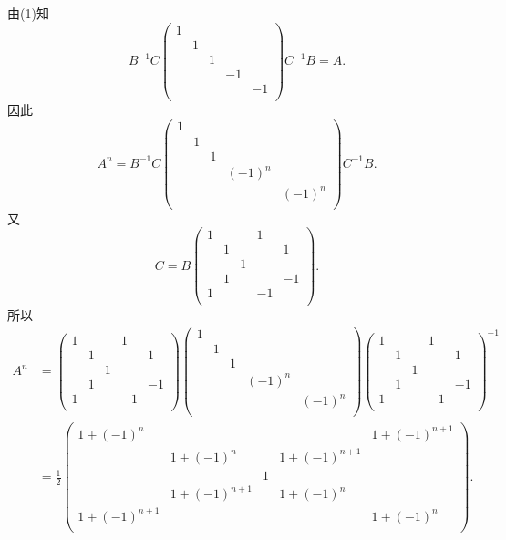 \begin{enumerate}[1~]
\begin{solution}
\[\]
由(1)知\[
B^{-1}C\left( \begin{matrix}
	1&		&		&		&		\\
	&		1&		&		&		\\
	&		&		1&		&		\\
	&		&		&		-1&		\\
	&		&		&		&		-1\\
\end{matrix} \right)C^{-1}B=A.
\]
因此\[
A^n=B^{-1}C\left( \begin{matrix}
	1&		&		&		&		\\
	&		1&		&		&		\\
	&		&		1&		&		\\
	&		&		&		(-1)^n&		\\
	&		&		&		&		(-1)^n\\
\end{matrix} \right)C^{-1}B.
\]
又\[
C=B\left( \begin{matrix}
	1&		&		&		1&		\\
	&		1&		&		&		1\\
	&		&		1&		&		\\
	&		1&		&		&		-1\\
	1&		&		&		-1&		\\
\end{matrix} \right).
\]
所以\begin{align*}
A^n&=\left( \begin{matrix}
	1&		&		&		1&		\\
	&		1&		&		&		1\\
	&		&		1&		&		\\
	&		1&		&		&		-1\\
	1&		&		&		-1&		\\
\end{matrix} \right)
\left( \begin{matrix}
	1&		&		&		&		\\
	&		1&		&		&		\\
	&		&		1&		&		\\
	&		&		&		(-1)^n&		\\
	&		&		&		&		(-1)^n\\
\end{matrix} \right)
\left( \begin{matrix}
	1&		&		&		1&		\\
	&		1&		&		&		1\\
	&		&		1&		&		\\
	&		1&		&		&		-1\\
	1&		&		&		-1&		\\
\end{matrix} \right)^{-1}\\
&=\frac12\left( \begin{matrix}
	1+(-1)^n&		&		&		&1+(-1)^{n+1}		\\
	&		1+(-1)^n&		&1+(-1)^{n+1}		&		\\
	&		&		1&		&		\\
	&		1+(-1)^{n+1}&		&1+(-1)^n		&		\\
	1+(-1)^{n+1}&		&		&		&1+(-1)^n		\\
\end{matrix} \right).
\end{align*}


\end{solution}
\end{enumerate}
